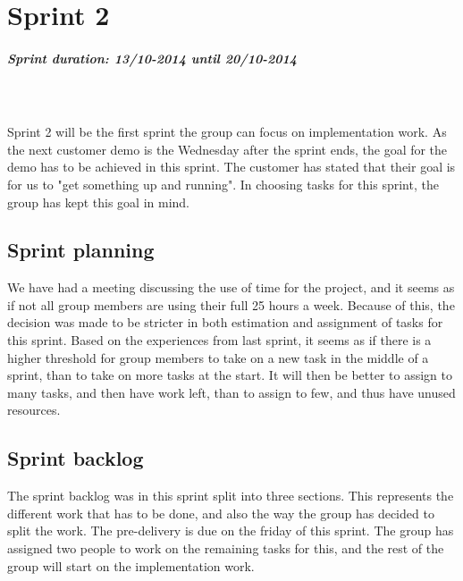 \documentclass[11pt,a4paper,titlepage,oneside]{report}
\begin{document}
\chapter{Sprint 2}
\paragraph{Sprint duration: 13/10-2014 until 20/10-2014} \hfill \\
\\
\noindent
Sprint 2 will be the first sprint the group can focus on implementation work. As the next customer demo is the Wednesday after the sprint ends, the goal for the demo has to be achieved in this sprint. The customer has stated that their goal is for us to "get something up and running". In choosing tasks for this sprint, the group has kept this goal in mind. 

\section{Sprint planning}
We have had a meeting discussing the use of time for the project, and it seems as if not all group members are using their full 25 hours a week. Because of this, the decision was made to be stricter in both estimation and assignment of tasks for this sprint. Based on the experiences from last sprint, it seems as if there is a higher threshold for group members to take on a new task in the middle of a sprint, than to take on more tasks at the start. It will then be better to assign to many tasks, and then have work left, than to assign to few, and thus have unused resources. 

\section{Sprint backlog}
The sprint backlog was in this sprint split into three sections. This represents the different work that has to be done, and also the way the group has decided to split the work. The \gls{pre-delivery} is due on the friday of this sprint. The group has assigned two people to work on the remaining tasks for this, and the rest of the group will start on the implementation work. 
\end{document}
